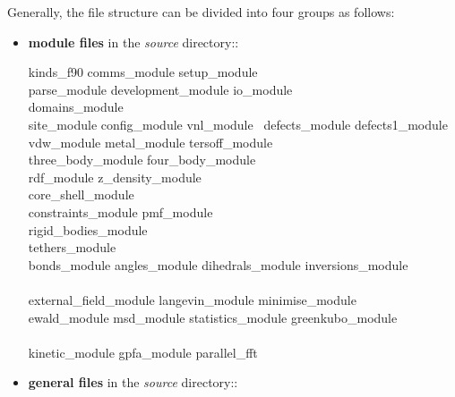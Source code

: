Generally, the \D file structure can be divided into four groups
as follows:
\begin{itemize}

\item {\bf module files} in the {\em source} directory::

{\sc
kinds\_f90 comms\_module setup\_module \\
parse\_module development\_module io\_module \\
domains\_module \\
site\_module config\_module vnl\_module \
defects\_module defects1\_module \\
vdw\_module metal\_module tersoff\_module \\
three\_body\_module four\_body\_module \\
rdf\_module z\_density\_module \\
core\_shell\_module \\
constraints\_module pmf\_module \\
rigid\_bodies\_module \\
tethers\_module \\
bonds\_module angles\_module dihedrals\_module inversions\_module \\
\\
external\_field\_module langevin\_module minimise\_module \\
ewald\_module msd\_module statistics\_module greenkubo\_module \\
\\
kinetic\_module gpfa\_module parallel\_fft}

\item {\bf general files} in the {\em source} directory::


\end{itemize}
